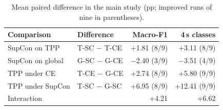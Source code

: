\begin{table}[t]
\caption{Mean paired difference in the main study (pp; improved runs of nine in parentheses).}
\label{tab:contrast}
\centering\footnotesize
\setlength{\tabcolsep}{4pt}
\begin{tabular}{llrr}
\toprule
Comparison & Difference & Macro-F1 & 4\,s classes\\
\midrule
SupCon on TPP & T-SC $-$ T-CE & +1.81 (8/9) & +3.11 (8/9)\\
SupCon on global & G-SC $-$ G-CE & $-$2.40 (3/9) & $-$3.51 (4/9)\\
TPP under CE & T-CE $-$ G-CE & +2.74 (8/9) & +5.80 (9/9)\\
TPP under SupCon & T-SC $-$ G-SC & +6.95 (8/9) & +12.41 (9/9)\\
\midrule
Interaction & & +4.21\phantom{ (0/9)} & +6.62\phantom{ (0/9)}\\
\bottomrule
\end{tabular}
\end{table}
